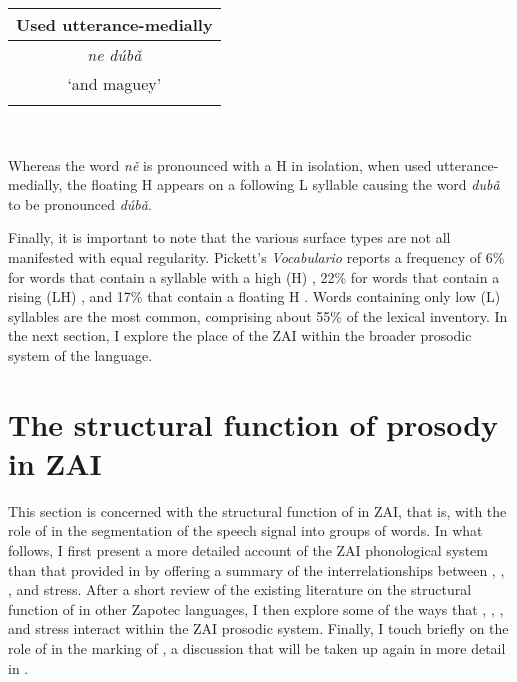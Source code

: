 \begin{table}

\begin{tabular}{ c }
\midrule
Used utterance-medially \\

\midrule
\textit{n{e}}  \textit{d\'{u}b\v{a}} \\
`and maguey' \\

\lspbottomrule
\end{tabular} \\

\end{table}

Whereas the word \textit{n\v{e}} is pronounced with a H  in isolation, when used utterance-medially, the floating H  appears on a following L  syllable causing the word \textit{dub\v{a}} to be pronounced \textit{d\'{u}b\v{a}}.

Finally, it is important to note that the various surface  types are not all manifested with equal regularity. Pickett's \textit{Vocabulario} \citep{pickett1979} reports a frequency of 6\% for words that contain a syllable with a high (H) , 22\% for words that contain a rising (LH) , and 17\% that contain a floating H . Words containing only low (L)  syllables are the most common, comprising about 55\% of the lexical inventory. In the next section, I explore the place of the ZAI  within the broader prosodic system of the language.


\section{The structural function of prosody in ZAI}\label{prosody}

This section is concerned with the structural function of  in ZAI, that is, with the role of  in the segmentation of the speech signal into groups of words. In what follows, I first present a more detailed account of the ZAI phonological system than that provided in  by offering a summary of the interrelationships between , , , and stress. After a short review of the existing literature on the structural function of  in other Zapotec languages, I then explore some of the ways that , , , and stress interact within the ZAI prosodic system. Finally, I touch briefly on the role of  in the marking of , a discussion that will be taken up again in more detail in .

